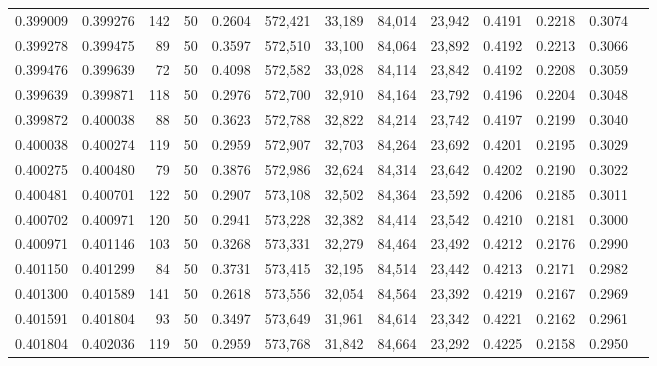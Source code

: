 \begin{tabular}{rrrrrrrrrrrrr}
0.399009 & 0.399276 &   142 &  50 &                                     0.2604 & 572,421 &  33,189 &  84,014 &  23,942 & 0.4191 & 0.2218 & 0.3074 \\
0.399278 & 0.399475 &    89 &  50 &                                     0.3597 & 572,510 &  33,100 &  84,064 &  23,892 & 0.4192 & 0.2213 & 0.3066 \\
0.399476 & 0.399639 &    72 &  50 &                                     0.4098 & 572,582 &  33,028 &  84,114 &  23,842 & 0.4192 & 0.2208 & 0.3059 \\
0.399639 & 0.399871 &   118 &  50 &                                     0.2976 & 572,700 &  32,910 &  84,164 &  23,792 & 0.4196 & 0.2204 & 0.3048 \\
0.399872 & 0.400038 &    88 &  50 &                                     0.3623 & 572,788 &  32,822 &  84,214 &  23,742 & 0.4197 & 0.2199 & 0.3040 \\
0.400038 & 0.400274 &   119 &  50 &                                     0.2959 & 572,907 &  32,703 &  84,264 &  23,692 & 0.4201 & 0.2195 & 0.3029 \\
0.400275 & 0.400480 &    79 &  50 &                                     0.3876 & 572,986 &  32,624 &  84,314 &  23,642 & 0.4202 & 0.2190 & 0.3022 \\
0.400481 & 0.400701 &   122 &  50 &                                     0.2907 & 573,108 &  32,502 &  84,364 &  23,592 & 0.4206 & 0.2185 & 0.3011 \\
0.400702 & 0.400971 &   120 &  50 &                                     0.2941 & 573,228 &  32,382 &  84,414 &  23,542 & 0.4210 & 0.2181 & 0.3000 \\
0.400971 & 0.401146 &   103 &  50 &                                     0.3268 & 573,331 &  32,279 &  84,464 &  23,492 & 0.4212 & 0.2176 & 0.2990 \\
0.401150 & 0.401299 &    84 &  50 &                                     0.3731 & 573,415 &  32,195 &  84,514 &  23,442 & 0.4213 & 0.2171 & 0.2982 \\
0.401300 & 0.401589 &   141 &  50 &                                     0.2618 & 573,556 &  32,054 &  84,564 &  23,392 & 0.4219 & 0.2167 & 0.2969 \\
0.401591 & 0.401804 &    93 &  50 &                                     0.3497 & 573,649 &  31,961 &  84,614 &  23,342 & 0.4221 & 0.2162 & 0.2961 \\
0.401804 & 0.402036 &   119 &  50 &                                     0.2959 & 573,768 &  31,842 &  84,664 &  23,292 & 0.4225 & 0.2158 & 0.2950 \\

\end{tabular}
